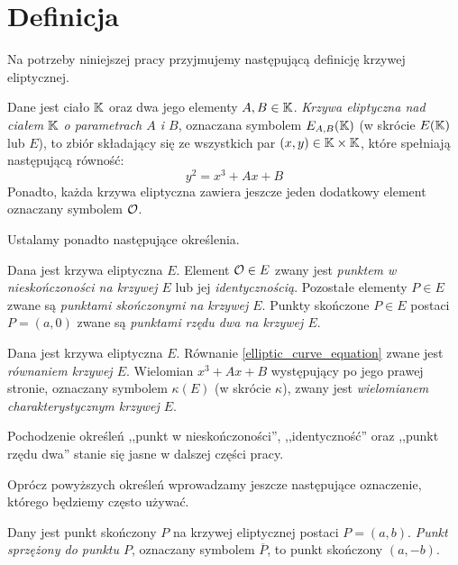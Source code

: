 \section{Definicja}

\noindent
Na potrzeby niniejszej pracy przyjmujemy
następującą definicję krzywej eliptycznej.

\begin{definition}\label{elliptic_curve_definition}
Dane jest ciało $\mathbb{K}$ oraz dwa jego elementy $A, B \in \mathbb{K}$.
\emph{Krzywa eliptyczna nad ciałem $\mathbb{K}$ o parametrach $A$ i $B$},
oznaczana symbolem $E_{A,B}(\mathbb{K})$ (w skrócie $E(\mathbb{K})$ lub $E$),
to zbiór składający się
ze wszystkich par $(x, y) \in \mathbb{K} \times \mathbb{K}$,
które spełniają następującą równość:
\begin{equation}\label{elliptic_curve_equation}
y^2 = x^3 + Ax + B
\end{equation}
Ponadto, każda krzywa eliptyczna zawiera jeszcze jeden dodatkowy element
oznaczany symbolem $\mathcal{O}$.
\end{definition}

\noindent
Ustalamy ponadto następujące określenia.

\begin{definition}
Dana jest krzywa eliptyczna $E$.
Element $\mathcal{O} \in E$ zwany jest
\emph{punktem w nieskończoności na krzywej $E$} lub jej \emph{identycznością}.
Pozostałe elementy $P \in E$
zwane są \emph{punktami skończonymi na krzywej $E$}.
Punkty skończone $P \in E$ postaci $P = (a, 0)$
zwane są \emph{punktami rzędu dwa na krzywej $E$}.
\end{definition}

\begin{definition}
Dana jest krzywa eliptyczna $E$.
Równanie \ref{elliptic_curve_equation} zwane jest \emph{równaniem krzywej $E$}.
Wielomian $x^3 + Ax + B$ występujący po jego prawej stronie,
oznaczany symbolem $\kappa(E)$ (w skrócie $\kappa$),
zwany jest \emph{wielomianem charakterystycznym krzywej $E$}.
\end{definition}

\noindent
Pochodzenie określeń
,,punkt w nieskończoności'', ,,identyczność'' oraz ,,punkt rzędu dwa''
stanie się jasne w dalszej części pracy.

\noindent
Oprócz powyższych określeń
wprowadzamy jeszcze następujące oznaczenie,
którego będziemy często używać.

\begin{definition}
Dany jest punkt skończony $P$ na krzywej eliptycznej postaci $P = (a, b)$.
\emph{Punkt sprzężony do punktu $P$},
oznaczany symbolem $\overline{P}$,
to punkt skończony $(a, -b)$.
\end{definition}

